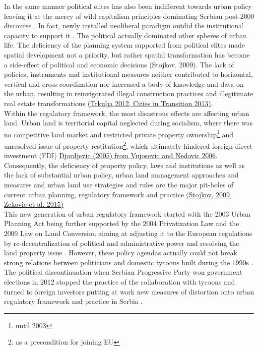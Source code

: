 \documentclass[11pt]{report}
\begin{document}
In the same manner political elites has also been indifferent towards urban policy leaving it at the mercy of wild capitalism principles dominating Serbian post-2000 discourse \href{ref}{\citealt{vujovic_belgrades_2007}}.
In fact, newly installed neoliberal paradigm outdid the institutional capacity to support it \cite{Peric 2016}.
The political actually dominated other spheres of urban life. The deficiency of the planning system supported from political elites made spatial development not a priority, but rather spatial transformation has become a side-effect of political and economic decisions (Stojkov, 2009). 
The lack of policies, instruments and institutional measures neither contributed to horizontal, vertical and cross coordination nor increased a body of knowledge and data on the urban, resulting in reinvigorated illegal construction practices and illegitimate real estate transformations \href{ref}{(Trkulja 2012, Cities in Transition 2013)}.
\\

Within the regulatory framework, the most disastrous effects are affecting urban land. Urban land is territorial capital neglected during socialism, where there was no competitive land market and restricted private property ownership\footnote{until 2003} and unresolved issue of property restitution\footnote{as a precondition for joining EU}, which ultimately hindered foreign direct investment (FDI) \href{ref}{Djordjevic (2005) from Vujosevic and Nedovic 2006}.  
Consequently, the deficiency of property policy, laws and institutions as well as the lack of substantial urban policy, urban land management approaches and measures and urban land use strategies and rules are the major pit-holes of current urban planning, regulatory framework and practice \href{ref}{(Stojkov, 2009, Zekovic et al. 2015)} 
\\

This new generation of urban regulatory framework started with the 2003 Urban Planning Act being further supported by the 2004 Privatization Law and the 2009 Law on Land Conversion aiming at adjusting it to the European regulations by re-decentralization of political and administrative power and resolving the land property issue \cite{Cagic 2014}. However, these policy agendas actually could not break strong relations between politicians and domestic tycoons built during the 1990s \href{ref}{\citealt{peric_evolution_2016}}.
The political discontinuation when Serbian Progressive Party won government elections in 2012 stopped the practice of the collaboration with tycoons and turned to foreign investors putting at work new measures of distortion onto urban regulatory framework and practice in Serbia \cite{ibid.}.
            
\end{document}

